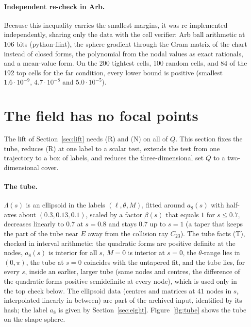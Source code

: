 \documentclass[11pt]{article}
\theoremstyle{definition}
\begin{document}
\paragraph{Independent re-check in Arb.}\label{sec:arb}
Because this inequality carries the smallest margins, it was re-implemented independently, sharing only the data with
the cell verifier: Arb ball arithmetic at 106 bits (python-flint), the sphere gradient through the Gram matrix of the
chart instead of closed forms, the polynomial from the nodal values as exact rationals, and a mean-value form. On the
200 tightest cells, 100 random cells, and 84 of the 192 top cells for the far condition, every lower bound is positive
(smallest $1.6\cdot10^{-9}$, $4.7\cdot10^{-8}$ and $5.0\cdot10^{-5}$).

\section{The field has no focal points}\label{sec:field}
The lift of Section~\ref{sec:lift} needs (R) and (N) on all of $Q$. This section fixes the tube, reduces (R) at one
label to a scalar test, extends the test from one trajectory to a box of labels, and reduces the three-dimensional
set $Q$ to a two-dimensional cover.

\paragraph{The tube.} $\Lambda(s)$ is an ellipsoid in the labels $(\ell,\theta,M)$, fitted around $a_8(s)$ with
half-axes about $(0.3,0.13,0.1)$, scaled by a factor $\beta(s)$ that equals $1$ for $s\le0.7$, decreases linearly to
$0.7$ at $s=0.8$ and stays $0.7$ up to $s=1$ (a taper that keeps the part of the tube near $E$ away from the collision
ray $C_{23}$). The tube facts (T), checked in interval arithmetic: the quadratic forms are positive definite at the
nodes, $a_8(s)$ is interior for all $s$, $M=0$ is interior at $s=0$, the $\theta$-range lies in $(0,\pi)$, the tube
at $s=0$ coincides with the untapered fit, and the tube lies, for every $s$, inside an earlier, larger tube (same nodes
and centres, the difference of the quadratic forms positive semidefinite at every node), which is used only in the top
check below. The ellipsoid data (centres and matrices at $41$ nodes in $s$, interpolated linearly in between) are part
of the archived input, identified by its hash; the label $a_8$ is given by Section~\ref{sec:eight}. Figure~\ref{fig:tube} shows the tube on the shape sphere.
\end{document}
